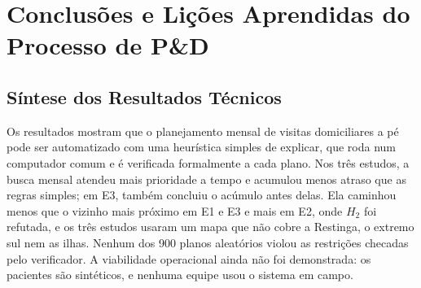 \documentclass[11pt,a4paper]{article}
\begin{document}
\section{Conclusões e Lições Aprendidas do Processo de P\&D}

\subsection{Síntese dos Resultados Técnicos}
Os resultados mostram que o planejamento mensal de visitas domiciliares a pé pode ser automatizado com uma heurística simples de explicar, que roda num computador comum e é verificada formalmente a cada plano. Nos três estudos, a busca mensal atendeu mais prioridade a tempo e acumulou menos atraso que as regras simples; em E3, também concluiu o acúmulo antes delas. Ela caminhou menos que o vizinho mais próximo em E1 e E3 e mais em E2, onde $H_2$ foi refutada, e os três estudos usaram um mapa que não cobre a Restinga, o extremo sul nem as ilhas. Nenhum dos 900 planos aleatórios violou as restrições checadas pelo verificador. A viabilidade operacional ainda não foi demonstrada: os pacientes são sintéticos, e nenhuma equipe usou o sistema em campo.
\end{document}
